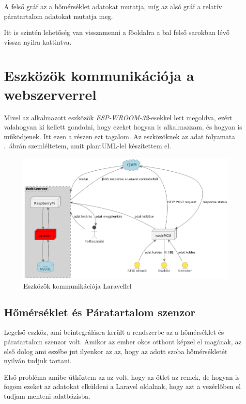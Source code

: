 \documentclass[
]{thesis-ekf}
\theoremstyle{definition}
\theoremstyle{remark}
\begin{document}
	A felső gráf az a hőmérséklet adatokat mutatja, míg az alsó gráf a relatív páratartalom adatokat mutatja meg. 
	
	Itt is szintén lehetőség van visszamenni a főoldalra a bal felső sarokban lévő vissza nyílra kattintva.
	\section{Eszközök kommunikációja a webszerverrel}\label{csatlakozas-a-webszerverre}
	Mivel az alkalmazott eszközök \emph{ESP-WROOM-32}-esekkel lett megoldva, ezért valahogyan ki kellett gondolni, hogy ezeket hogyan is alkalmazzam, és hogyan is működjenek. Itt ezen a részen ezt tagalom. Az eszközöknek az adat folyamata .~ábrán szemléltetem, amit plantUML-lel készítettem el.
	
	\begin{figure}[ht!]
		\centering
		\includegraphics[width=1\textwidth]{./src/HU_sensor with webserver uml diagram}
		\caption{Eszközök kommunikációja Laravellel}
		\label{esp-laravel.communication}
	\end{figure}
	
	\subsection{Hőmérséklet és Páratartalom szenzor}
	Legelső eszköz, ami beintegrálásra került a rendszerbe az a hőmérséklet és páratartalom szenzor volt. Amikor az ember okos otthont képzel el magának, az első dolog ami eszébe jut ilyenkor az az, hogy az adott szoba hőmérsékletét nyilván tudjuk tartani. 
	
	Első probléma amibe ütköztem az az volt, hogy az ötlet az remek, de hogyan is fogom ezeket az adatokat elküldeni a Laravel oldalnak, hogy azt a vezérlőben el tudjam menteni adatbázisba.
	
\end{document}
